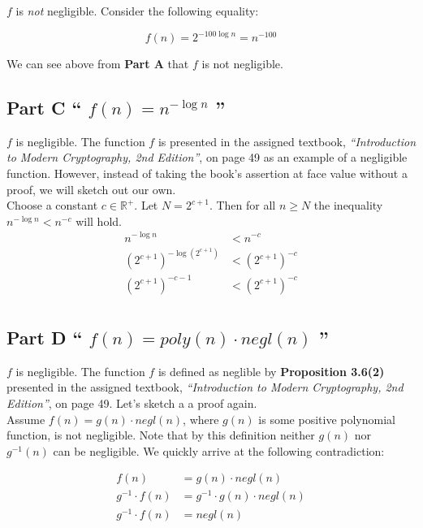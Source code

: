 \documentclass{article}
\newcommand{\HomeworkText}[1]{\textbf{``#1''}\\}
\begin{document}
	$f$ is \emph{not} negligible. Consider the following equality:
	
	$$ f(n) = 2^{-100 \log n} = n^{-100}$$
	
	We can see above from \textbf{Part A} that $f$ is not negligible.
	
	\subsection*{Part C
	\HomeworkText{
		$f(n) = n^{-\log n}$
	}}

	$f$ is negligible. The function $f$ is presented in the assigned textbook, \emph{``Introduction to Modern Cryptography, 2nd Edition''}, on page 49 as an example of a negligible function. However, instead of taking the book's assertion at face value without a proof, we will sketch out our own.\\
	
	Choose a constant $c \in \mathbb{R}^{+}$. Let $N = 2^{c+1}$. Then for all $n \ge N$ the inequality $n^{-\log n} < n^{-c}$ will hold.\\
	
	\begin{equation}
	\begin{split}
	  	n^{-\log n} & < n^{-c} \\
	  	(2^{c+1})^{-\log(2^{c+1})} & < (2^{c+1})^{-c} \\
	    (2^{c+1})^{-c - 1} & < (2^{c+1})^{-c} \\
	\end{split}
	\end{equation}


	\subsection*{Part D
	\HomeworkText{
		$f(n) = poly(n) \cdot negl(n)$
	}}

	$f$ is negligible. The function $f$ is defined as neglible by \textbf{Proposition 3.6(2)} presented in the assigned textbook, \emph{``Introduction to Modern Cryptography, 2nd Edition''}, on page 49. Let's sketch a a proof again.\\
	
	Assume $f(n) = g(n) \cdot negl(n)$, where $g(n)$ is some positive polynomial function, is not negligible. Note that by this definition neither $g(n)$ nor $g^{-1}(n)$ can be negligible. We quickly arrive at the following contradiction:
	
	\begin{equation}
	\begin{split}
	f(n) & = g(n) \cdot negl(n) \\
	g^{-1} \cdot f(n) & = g^{-1} \cdot g(n) \cdot negl(n) \\
	g^{-1} \cdot f(n) & = negl(n) \\
	\end{split}
	\end{equation}
	
\end{document}
